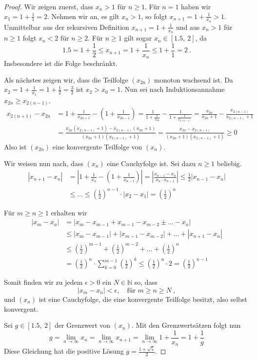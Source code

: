 \begin{proof}
Wir zeigen zuerst, dass $x_n > 1$ für $n \geq 1$.
Für $n = 1$ haben wir $x_1 = 1 + \frac 1 1 = 2$.
Nehmen wir an, es gilt $x_n > 1$, so folgt $x_{n+1} = 1 + \frac{1}{x_n} > 1$.
Unmittelbar aus der rekursiven Definition $x_{n+1} = 1 + \frac{1}{x_n}$ und
aus $x_n > 1$ für $n \geq 1$ folgt $x_n < 2$ für $n \geq 2$.
Für $n \geq 1$ gilt sogar $x_n \in \left[ 1.5, \  2 \right]$, da
\[
1.5 = 1 + \frac 1 2 \leq x_{n+1} = 1 + \frac{1}{x_n} \leq 1 + \frac 1 1 = 2 \ .
\]
Insbesondere ist die Folge beschränkt.

Als nächstes zeigen wir, dass die Teilfolge $(x_{2n})$ monoton wachsend ist. Da 
$x_2 = 1 + \frac{1}{x_1} = 1 + \frac{1}{2} = \frac{3}{2}$ ist $x_2 > x_0 = 1$.
Nun sei nach Induktionsannahme $x_{2n} \geq x_{2(n-1)}$.
\begin{align*}
x_{2(n+1)} - x_{2n}
	&= 1 + \frac{1}{x_{2n+1}} - \left( 1 + \frac{1}{x_{2n-1}} \right)
	= \frac{1}{1 + \frac{1}{x_{2n}}} - \frac{1}{1 + \frac{1}{x_{2(n-1)}}}
	= \frac{x_{2n}}{x_{2n}+1} - \frac{x_{2(n-1)}}{x_{2(n-1)} + 1} \\
	&= \frac{ x_{2n} (x_{2(n-1)} + 1) - x_{2(n-1)} (x_{2n} + 1)}{(x_{2n}+1)(x_{2(n-1)}+1)}
	= \frac{x_{2n} - x_{2(n-1)}}{(x_{2n}+1)(x_{2(n-1)}+1)} \geq 0
\end{align*}
Also ist $(x_{2n})$ eine konvergente Teilfolge von $(x_n)$.

Wir weisen nun nach, dass $(x_n)$ eine Cauchyfolge ist. Sei dazu $n \geq 1$ beliebig.
\begin{align*}
| x_{n+1} - x_n | 
	&= \left| 1 + \frac{1}{x_n} - \left( 1 + \frac{1}{x_{n-1}} \right) \right|
	= \left| \frac{ x_{n-1} - x_n}{x_n \cdot x_{n-1}} \right|
	\leq \frac 1 2 | x_{n-1} - x_n | \\
	&\leq \ldots \leq \left( \frac 1 2 \right)^{n-1} \cdot |x_2 - x_1 |
	= \left( \frac 1 2 \right)^n
\end{align*}

Für $m \geq n \geq 1$ erhalten wir
\begin{align*}
| x_m - x_n | 
	&= | x_m - x_{m-1} + x_{m-1} - x_{m-2} \pm \ldots - x_n | \\
	&\leq |x_m - x_{m-1} | + | x_{m-1} - x_{m-2} | + \ldots + |x_{n+1} - x_n| \\
	&\leq \left( \frac 1 2 \right)^{m-1} + \left( \frac 1 2 \right)^{m-2} + \ldots
	+ \left( \frac 1 2 \right)^n \\
	&= \left( \frac 1 2 \right)^n \cdot \sum_{k=0}^{m-1} \left( \frac 1 2 \right)^k 
	\leq \left( \frac 1 2 \right)^n \cdot 2
	= \left( \frac 1 2 \right)^{n-1}
\end{align*}

Somit finden wir zu jedem $\epsilon > 0$ ein $N \in \mathbb N$ so, dass
\[
|x_m - x_n| < \epsilon, \quad \text{für } m \geq n \geq N \ ,
\]
und $(x_n)$ ist eine Cauchyfolge, die eine konvergente Teilfolge besitzt, also selbst
konvergent.

Sei $g \in \left[ 1.5, \ 2 \right]$ der Grenzwert von $(x_n)$.
Mit den Grenzwertsätzen folgt nun
\[
g = \lim_{n \to \infty} x_n = \lim_{n \to \infty} x_{n+1}
	= \lim_{n \to \infty} 1 + \frac{1}{x_n} = 1 + \frac 1 g
\]
Diese Gleichung hat die positive Lösung $g = \frac{{1} + \sqrt{5}}{2}$.
\end{proof}


